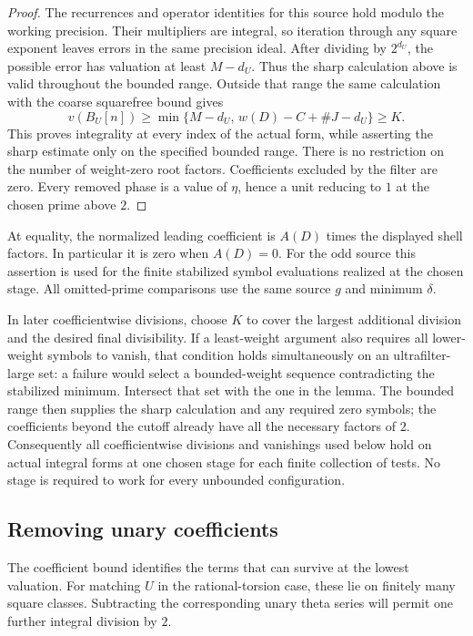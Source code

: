 \begin{proof}
The recurrences and operator identities for this source hold modulo
the working precision. Their multipliers are integral, so iteration
through any square exponent leaves errors in the same precision ideal.
After dividing by $2^{d_U}$, the possible error has valuation at least
$M-d_U$. Thus the sharp calculation above is valid throughout the
bounded range. Outside that range the same calculation with the coarse
squarefree bound gives
\[
 v(B_U[n])\ge
 \min\{M-d_U,\,w(D)-C+\#J-d_U\}\ge K.
\]
This proves integrality at every index of the actual form, while
asserting the sharp estimate only on the specified bounded range.
There is no restriction on the number of weight-zero root factors.
Coefficients excluded by the filter are zero. Every removed phase
is a value of $\eta$, hence a unit reducing to $1$ at the chosen
prime above $2$.
\end{proof}

At equality, the normalized leading coefficient is $A(D)$ times the
displayed shell factors. In particular it is zero when $A(D)=0$.
For the odd source this assertion is used for the finite stabilized
symbol evaluations realized at the chosen stage. All omitted-prime
comparisons use the same source $g$ and minimum $\delta$.

In later coefficientwise divisions, choose $K$ to cover the largest
additional division and the desired final divisibility. If a least-weight
argument also requires all lower-weight symbols to vanish, that condition
holds simultaneously on an ultrafilter-large set: a failure would select
a bounded-weight sequence contradicting the stabilized minimum. Intersect
that set with the one in the lemma. The bounded range then supplies the
sharp calculation and any required zero symbols; the coefficients beyond
the cutoff already have all the necessary factors of $2$. Consequently
all coefficientwise divisions and vanishings used below hold on actual
integral forms at one chosen stage for each finite collection of tests.
No stage is required to work for every unbounded configuration.

\subsection{Removing unary coefficients}

The coefficient bound identifies the terms that can survive at the
lowest valuation. For matching $U$ in the rational-torsion case, these
lie on finitely many square classes. Subtracting the corresponding unary
theta series will permit one further integral division by $2$.

